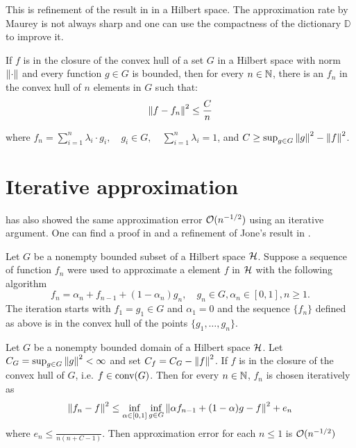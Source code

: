 \begin{remark}
    This is refinement of the result in \cite{pisierRemarquesResultatNon1980} in
    a Hilbert space. The approximation rate by Maurey is not always sharp and
    one can use the compactness of the dictionary $\mathbb{D}$ to improve it.
\end{remark}

\begin{corollary}
    \label{cor:maurey}
    If $f$ is in the closure of the convex hull of a set $G$ in a Hilbert space
    with norm $\left\| \cdot \right\|$ and every function $g \in G$ is bounded, then for
    every $n \in \mathbb{N}$, there is an $f_n$ in the convex hull of $n$ elements in
    $G$ such that:
    \begin{equation}
        \left\| f - f_n \right\|^2 \leq \frac{C}{n}
    \end{equation}

    where $f_n = \sum_{i=1}^n \lambda_i \cdot g_i, \quad g_i \in G, \quad
    \sum_{i=1}^n \lambda_i = 1$, and $C \geq \sup_{g\in G} \left\| g \right\|^2 -
    \left\| f \right\|^2$.

\end{corollary}

\section{Iterative approximation}

\cite{jonesSimpleLemmaGreedy1992} has also showed the same approximation error
$\mathcal{O}(n^{-1/2})$ using an iterative argument. One can find a proof in
\cite[p. 611]{jonesSimpleLemmaGreedy1992} and a refinement of Jone's result in
\cite[Theorem 5]{barronUniversalApproximationBounds1993}. 

Let $G$ be a nonempty bounded subset of a Hilbert space $\mathcal{H}$. Suppose a
sequence of function $f_n$ were used to approximate a element $f$ in $\mathcal{H}$
with the following algorithm
\begin{equation}
    \label{eq:seq_appro_jones}
    f_n = \alpha_n + f_{n-1} + (1-\alpha_n) g_n, \quad
    g_n \in G, \alpha_n \in [0,1], n \geq 1.
\end{equation}
The iteration starts with $f_1 = g_1 \in G$ and $\alpha_1 = 0$ and the sequence
$\{f_n\}$ defined as above is in the convex hull of the points $\{g_1,\dots,
g_n\}$.

\begin{theorem}
    Let $G$ be a nonempty bounded domain of a Hilbert space $\mathcal{H}$. Let $C_G
    = \sup_{g\in G} \left\| g \right\|^2 < \infty$ and set $C_f = C_G - \left\| f \right\|^2$. If
    $f$ is in the closure of the convex hull of $G$, i.e. $f \in \textnormal{conv}(G)$. Then
    for every $n \in \mathbb{N}$, $f_n$ is chosen iteratively as
    \begin{equation}
        \left\| f_n - f \right\|^2 \leq \inf_{\alpha \in [0,1]} \inf_{g \in G}
        \left\| \alpha f_{n-1} + (1-\alpha)g - f \right\|^2 + e_n
    \end{equation}
    where $e_n \leq \frac{}{n(n+C -1 )}$.
    Then approximation error for each $n \leq 1$ is $\mathcal{O}(n^{-1/2})$
\end{theorem}

